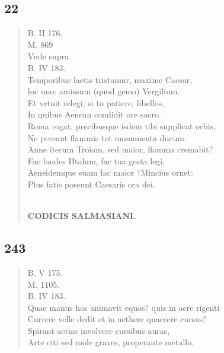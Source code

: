 \documentclass[11pt, a4paper]{report}
\begin{document}
            \subsection*{22}
      \begin{verse}
      B. II 176. \\ M. 869 \\ Vnde supra \\ B. IV 183. \\ Temporibus laetis tristamur, maxime Caesar, \\ loc uno: amissum (quod gemo) Vergilium. \\ Et vetuit relegi, si tu patiere, libellos, \\ In quibus Aenean condidit ore sacro. \\ Roma rogat, precibusque isdem tibi supplicat orbis, \\ Ne pereant flammis tot monumenta ducum. \\ Anne iterum Troiam, sed maior, flamma cremabit? \\ Fac laudes Htalum, fac tua gesta legi, \\ Aeneidemque suam fac maior †Mincius ornet: \\ Plus fatis possunt Caesaris ora dei. \\ 
        ﻿\pagebreak 
    \begin{center} \textbf{CODICIS SALMASIANI.} \end{center} \marginpar{[199]} 
      \end{verse}
  
            \subsection*{243}
      \begin{verse}
      B. V 175. \\ M. 1105. \\ B. IV 183. \\ Quae manus hos animavit equos? quis  \lbrack in \rbrack  aere rigenti \\ Currere velle dedit et in aethere quaerere cursus? \\ Spirant aerias involvere cursibus auras, \\ Arte citi sed mole graves, properante metallo. \\ 
      \end{verse}
  
\end{document}
